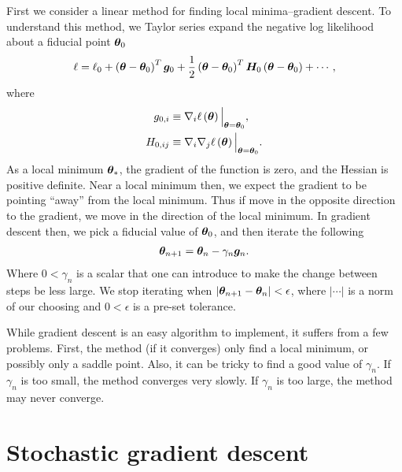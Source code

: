 First we consider a linear method for finding local minima--gradient descent.
To understand this method, we Taylor series expand the negative log likelihood
about a fiducial point ${\bm \theta}_0$
\begin{align}
    \label{eq:quadratic-taylor-vector}
    \ell 
    =
    \ell_0
    +
    \left({\bm \theta}-{\bm \theta}_0\right)^T{\bm g}_0
    +
    \frac{1}{2}\left({\bm \theta}-{\bm \theta}_0\right)^T {\bm H}_0 \left({\bm \theta}-{\bm \theta}_0\right) 
    +
    \cdots
    ,
\end{align}
where
\begin{align}
    g_{0,i}
    &\equiv
    \nabla_i\ell\left({\bm \theta}\right)\Big|_{{\bm \theta}={\bm \theta}_0}
    ,\\
    H_{0,ij}
    &\equiv
    \nabla_i\nabla_j\ell\left({\bm \theta}\right)
    \Big|_{{\bm \theta}={\bm \theta}_0}
    .
\end{align}
As a local minimum ${\bm \theta}_*$, the gradient of the function is zero, and
the Hessian is positive definite. 
Near a local minimum then, we expect the gradient to be pointing ``away''
from the local minimum.
Thus if move in the opposite direction to the gradient, we move in the direction
of the local minimum.
In gradient descent then, we pick a fiducial value of ${\bm \theta}_0$, and then
iterate the following
\begin{align}
    \label{eq:gd-step}
    {\bm \theta}_{n+1}
    =
    {\bm \theta}_n
    -
    \gamma_n {\bm g}_n
    .
\end{align}
Where $0<\gamma_n$
is a scalar that one can introduce to make the change between steps be less large.
We stop iterating when $\left|{\bm \theta}_{n+1}-{\bm \theta}_n\right|<\epsilon$, where
$\left|\cdots\right|$ is a norm of our choosing and $0<\epsilon$ is a pre-set tolerance.

While gradient descent is an easy algorithm to implement, it suffers from a
few problems. First, the method (if it converges) only find a local minimum,
or possibly only a saddle point.
Also, it can be tricky to find a good value of $\gamma_n$. 
If $\gamma_n$ is too small, the method converges very slowly.
If $\gamma_n$ is too large, the method may never converge.

\section{Stochastic gradient descent\label{sec:stochastic-gradient-descent}}

